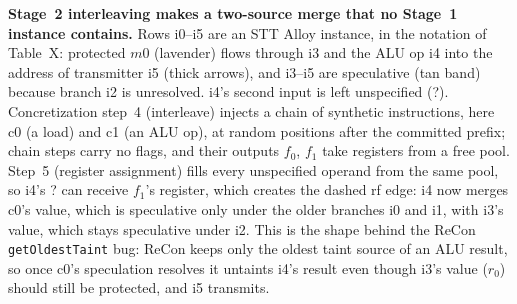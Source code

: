 \textbf{Stage~2 interleaving makes a two-source merge that no Stage~1 instance contains.} Rows i0--i5 are an STT Alloy instance, in the notation of Table~X: protected $m0$ (lavender) flows through i3 and the ALU op i4 into the address of transmitter i5 (thick arrows), and i3--i5 are speculative (tan band) because branch i2 is unresolved. i4's second input is left unspecified (?). Concretization step~4 (interleave) injects a chain of synthetic instructions, here c0 (a load) and c1 (an ALU op), at random positions after the committed prefix; chain steps carry no flags, and their outputs $f_0$, $f_1$ take registers from a free pool. Step~5 (register assignment) fills every unspecified operand from the same pool, so i4's ? can receive $f_1$'s register, which creates the dashed rf edge: i4 now merges c0's value, which is speculative only under the older branches i0 and i1, with i3's value, which stays speculative under i2. This is the shape behind the ReCon \texttt{getOldestTaint} bug: ReCon keeps only the oldest taint source of an ALU result, so once c0's speculation resolves it untaints i4's result even though i3's value ($r_0$) should still be protected, and i5 transmits.
